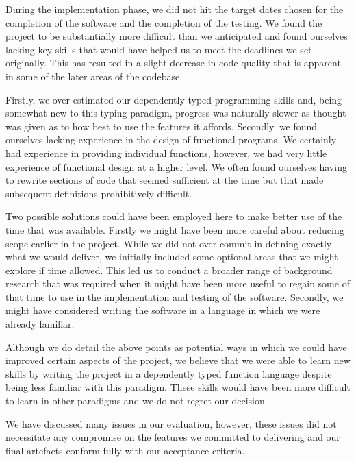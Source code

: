 During the implementation phase, we did not hit the target
dates chosen for the completion of the software and the completion of
the testing. We found the project to be substantially more difficult
than we anticipated and found ourselves lacking key skills that would
have helped us to meet the deadlines we set originally. This has
resulted in a slight decrease in code quality that is apparent in some
of the later areas of the codebase.

Firstly, we over-estimated our dependently-typed programming skills and,
being somewhat new to this typing paradigm, progress was naturally
slower as thought was given as to how best to use the features it
affords. Secondly, we found ourselves lacking experience in the design
of functional programs. We certainly had experience in providing
individual functions, however, we had very little experience of
functional design at a higher level. We often found ourselves having
to rewrite sections of code that seemed sufficient at the time but
that made subsequent definitions prohibitively difficult.

Two possible solutions could have been employed here
to make better use of the time that was available. Firstly we
might have been more careful about reducing scope earlier in the
project. While we did not over commit in defining exactly what we
would deliver, we initially included some optional areas that we might
explore if time allowed. This led us to conduct a broader range of
background research that was required when it might have been
more useful to regain some of that time to use in the implementation
and testing of the software. Secondly, we might have considered
writing the software in a language in which we were already familiar.

Although we do detail the above points as potential ways in which we
could have improved certain aspects of the project, we believe that we
were able to learn new skills by writing the project in a
dependently typed function language despite being less familiar with
this paradigm. These skills would have been more difficult to learn
in other paradigms and we do not regret our decision.

We have discussed many issues in our evaluation, however, these issues
did not necessitate any compromise on the features we committed to delivering
and our final artefacts conform fully with our acceptance criteria.

